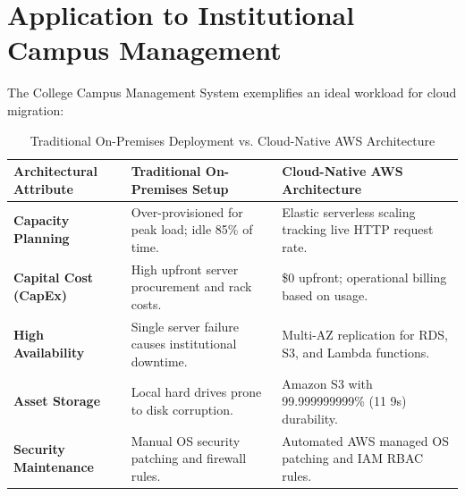 \section{Application to Institutional Campus Management}
The College Campus Management System exemplifies an ideal workload for cloud migration:
\begin{table}[htbp]
\centering
\caption{Traditional On-Premises Deployment vs. Cloud-Native AWS Architecture}
\label{tab:onprem_vs_cloud}
\small
\begin{tabular}{L{3.5cm} L{5.5cm} L{6.0cm}}
\hline
\textbf{Architectural Attribute} & \textbf{Traditional On-Premises Setup} & \textbf{Cloud-Native AWS Architecture} \\ \hline
\textbf{Capacity Planning} & Over-provisioned for peak load; idle 85\% of time. & Elastic serverless scaling tracking live HTTP request rate. \\ \hline
\textbf{Capital Cost (CapEx)} & High upfront server procurement and rack costs. & \$0 upfront; operational billing based on usage. \\ \hline
\textbf{High Availability} & Single server failure causes institutional downtime. & Multi-AZ replication for RDS, S3, and Lambda functions. \\ \hline
\textbf{Asset Storage} & Local hard drives prone to disk corruption. & Amazon S3 with 99.999999999\% (11 9s) durability. \\ \hline
\textbf{Security Maintenance} & Manual OS security patching and firewall rules. & Automated AWS managed OS patching and IAM RBAC rules. \\ \hline
\end{tabular}
\end{table}
